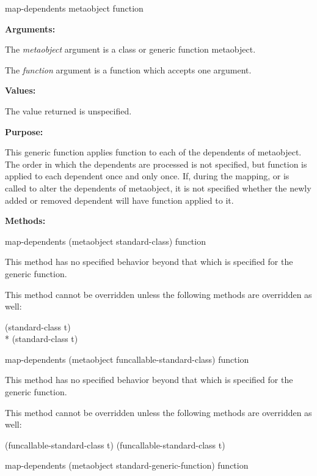 \begin{defun}
map-dependents metaobject function

\textbf{Arguments:}

The \emph{metaobject} argument is a class or generic function metaobject.

The \emph{function} argument is a function which accepts one argument.

\textbf{Values:}

The value returned is unspecified.

\textbf{Purpose:}

This generic function applies function to each of the dependents of
metaobject. The order in which the dependents are processed is not specified,
but function is applied to each dependent once and only once. If, during the
mapping,  or  is called to alter the
dependents of metaobject, it is not specified whether the newly added or removed
dependent will have function applied to it.

\textbf{Methods:}

\begin{defun}
map-dependents (metaobject standard-class) function

This method has no specified behavior beyond that which is specified for the generic function.

This method cannot be overridden unless the following methods are overridden as well:

\begin{tabbing}
     (standard-class t)\\*
     (standard-class t) 
\end{tabbing}
\end{defun}

\begin{defun}
map-dependents (metaobject funcallable-standard-class) function

This method has no specified behavior beyond that which is specified for the generic function.

This method cannot be overridden unless the following methods are overridden as well:

     (funcallable-standard-class t)
     (funcallable-standard-class t) 
\end{defun}

\begin{defun}
map-dependents (metaobject standard-generic-function) function


\end{defun}
\end{defun}
